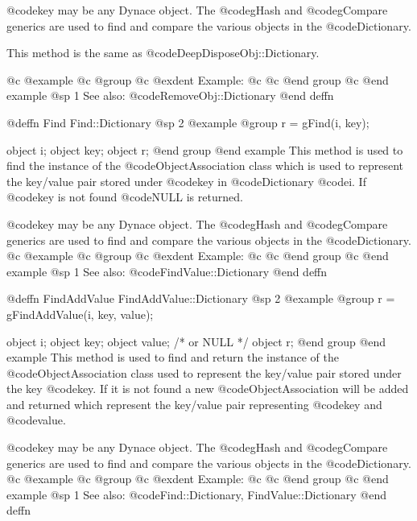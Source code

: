 @code{key} may be any Dynace object.  The @code{gHash} and
@code{gCompare} generics are used to find and compare the various
objects in the @code{Dictionary}.

This method is the same as @code{DeepDisposeObj::Dictionary}.

@c @example
@c @group
@c @exdent Example:
@c 
@c @end group
@c @end example
@sp 1
See also:  @code{RemoveObj::Dictionary}
@end deffn














@deffn {Find} Find::Dictionary
@sp 2
@example
@group
r = gFind(i, key);

object  i;
object  key;
object  r;
@end group
@end example
This method is used to find the instance of the @code{ObjectAssociation} class
which is used to represent the key/value pair stored under @code{key} in
@code{Dictionary} @code{i}.  If @code{key} is not found @code{NULL} is returned.

@code{key} may be any Dynace object.  The @code{gHash} and
@code{gCompare} generics are used to find and compare the various
objects in the @code{Dictionary}.
@c @example
@c @group
@c @exdent Example:
@c 
@c @end group
@c @end example
@sp 1
See also:  @code{FindValue::Dictionary}
@end deffn










@deffn {FindAddValue} FindAddValue::Dictionary
@sp 2
@example
@group
r = gFindAddValue(i, key, value);

object  i;
object  key;
object  value;    /*  or NULL   */
object  r;
@end group
@end example
This method is used to find and return the instance of the
@code{ObjectAssociation} class used to represent the key/value pair stored
under the key @code{key}.  If it is not found a new @code{ObjectAssociation} will be
added and returned which represent the key/value pair representing
@code{key} and @code{value}.

@code{key} may be any Dynace object.  The @code{gHash} and
@code{gCompare} generics are used to find and compare the various
objects in the @code{Dictionary}.
@c @example
@c @group
@c @exdent Example:
@c 
@c @end group
@c @end example
@sp 1
See also:  @code{Find::Dictionary, FindValue::Dictionary}
@end deffn









